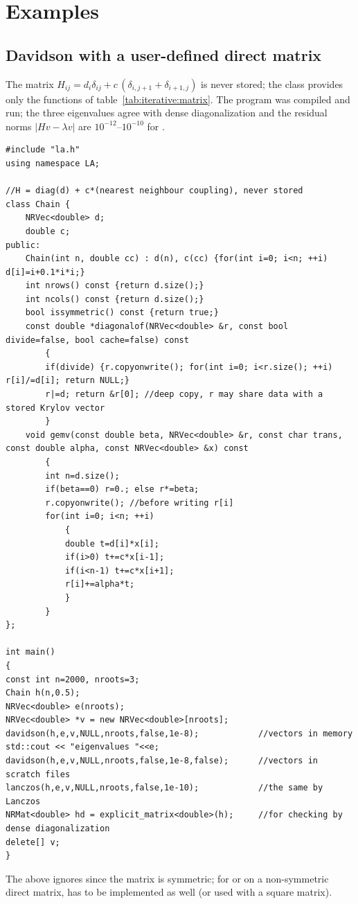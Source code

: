 \section{Examples}\label{sec:iterative:examples}

\subsection{Davidson with a user-defined direct matrix}

The matrix $H_{ij}=d_i\delta_{ij}+c\,(\delta_{i,j+1}+\delta_{i+1,j})$ is never stored; the class provides only the functions
of table~\ref{tab:iterative:matrix}. The program was compiled and run; the three eigenvalues agree with dense diagonalization
and the residual norms $|Hv-\lambda v|$ are $10^{-12}$--$10^{-10}$ for .
\begin{lstlisting}
#include "la.h"
using namespace LA;

//H = diag(d) + c*(nearest neighbour coupling), never stored
class Chain {
	NRVec<double> d;
	double c;
public:
	Chain(int n, double cc) : d(n), c(cc) {for(int i=0; i<n; ++i) d[i]=i+0.1*i*i;}
	int nrows() const {return d.size();}
	int ncols() const {return d.size();}
	bool issymmetric() const {return true;}
	const double *diagonalof(NRVec<double> &r, const bool divide=false, bool cache=false) const
		{
		if(divide) {r.copyonwrite(); for(int i=0; i<r.size(); ++i) r[i]/=d[i]; return NULL;}
		r|=d; return &r[0]; //deep copy, r may share data with a stored Krylov vector
		}
	void gemv(const double beta, NRVec<double> &r, const char trans, const double alpha, const NRVec<double> &x) const
		{
		int n=d.size();
		if(beta==0) r=0.; else r*=beta;
		r.copyonwrite(); //before writing r[i]
		for(int i=0; i<n; ++i)
			{
			double t=d[i]*x[i];
			if(i>0) t+=c*x[i-1];
			if(i<n-1) t+=c*x[i+1];
			r[i]+=alpha*t;
			}
		}
};

int main()
{
const int n=2000, nroots=3;
Chain h(n,0.5);
NRVec<double> e(nroots);
NRVec<double> *v = new NRVec<double>[nroots];
davidson(h,e,v,NULL,nroots,false,1e-8);            //vectors in memory
std::cout << "eigenvalues "<<e;
davidson(h,e,v,NULL,nroots,false,1e-8,false);      //vectors in scratch files
lanczos(h,e,v,NULL,nroots,false,1e-10);            //the same by Lanczos
NRMat<double> hd = explicit_matrix<double>(h);     //for checking by dense diagonalization
delete[] v;
}
\end{lstlisting}
The  above ignores  since the matrix is symmetric; for  or  on a
non-symmetric direct matrix,  has to be implemented as well (or  used with a square matrix).

